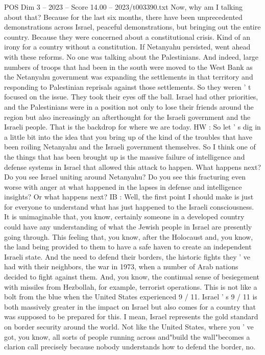 \begin{textsample}{POS Dim 3 – 2023 – Score 14.00 – 2023/t003390.txt}
Now, why am I talking about that?
Because for the last six months, there have been unprecedented demonstrations across Israel, peaceful demonstrations, but bringing out the entire country.
Because they were concerned about a constitutional crisis.
Kind of an irony for a country without a constitution.
If Netanyahu persisted, went ahead with these reforms.
No one was talking about the Palestinians.
And indeed, large numbers of troops that had been in the south were moved to the West Bank as the Netanyahu government was expanding the settlements in that territory and responding to Palestinian reprisals against those settlements.
So they weren ' t focused on the issue.
They took their eyes off the ball.
Israel had other priorities, and the Palestinians were in a position not only to lose their friends around the region but also increasingly an afterthought for the Israeli government and the Israeli people.
That is the backdrop for where we are today.
HW : So let ' s dig in a little bit into the idea that you bring up of the kind of the troubles that have been roiling Netanyahu and the Israeli government themselves.
So I think one of the things that has been brought up is the massive failure of intelligence and defense systems in Israel that allowed this attack to happen.
What happens next?
Do you see Israel uniting around Netanyahu?
Do you see this fracturing even worse with anger at what happened in the lapses in defense and intelligence insights?
Or what happens next?
IB : Well, the first point I should make is just for everyone to understand what has just happened to the Israeli consciousness.
It is unimaginable that, you know, certainly someone in a developed country could have any understanding of what the Jewish people in Israel are presently going through.
This feeling that, you know, after the Holocaust and, you know, the land being provided to them to have a safe haven to create an independent Israeli state.
And the need to defend their borders, the historic fights they ' ve had with their neighbors, the war in 1973, when a number of Arab nations decided to fight against them.
And, you know, the continual sense of besiegement with missiles from Hezbollah, for example, terrorist operations.
This is not like a bolt from the blue when the United States experienced 9 / 11.
Israel ' s 9 / 11 is both massively greater in the impact on Israel but also comes for a country that was supposed to be prepared for this.
I mean, Israel represents the gold standard on border security around the world.
Not like the United States, where you ' ve got, you know, all sorts of people running across and"build the wall"becomes a clarion call precisely because nobody understands how to defend the border, no.

\end{textsample}
